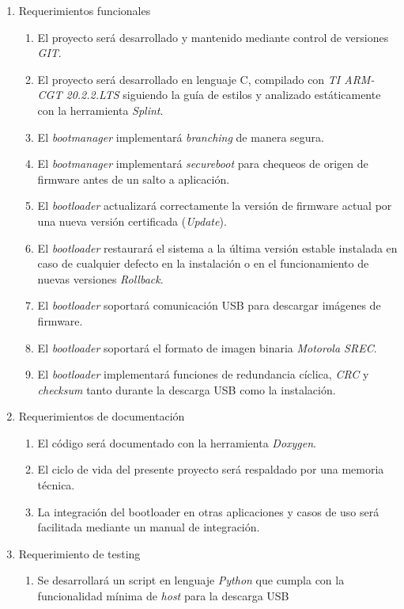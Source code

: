 \documentclass[12pt,a4paper]{article}
\begin{document}
\begin{enumerate}
	\item Requerimientos funcionales
		\begin{enumerate}
			\item El proyecto será desarrollado y mantenido mediante control de versiones \textit{GIT}.
			\item El proyecto será desarrollado en lenguaje C, compilado con \textit{TI ARM-CGT 20.2.2.LTS} siguiendo la guía de estilos y analizado 
			estáticamente con la herramienta \textit{Splint}.
			\item El \textit{bootmanager} implementará \textit{branching} de manera segura.
			\item El \textit{bootmanager} implementará \textit{secureboot} para chequeos de origen de firmware antes de un salto a aplicación. 
			\item El \textit{bootloader} actualizará correctamente la versión de firmware actual por una nueva versión certificada 	
			(\textit{Update}).
			\item El \textit{bootloader} restaurará el sistema a la última versión estable instalada en caso de cualquier defecto en la 
			instalación o en el funcionamiento de nuevas versiones \textit{Rollback}.
			\item El \textit{bootloader} soportará comunicación USB para descargar imágenes de firmware.
			\item El \textit{bootloader} soportará el formato de imagen binaria \textit{Motorola SREC}.
			\item El \textit{bootloader} implementará funciones de redundancia cíclica, \textit{CRC} y \textit{checksum} tanto durante la descarga 
			USB como la instalación.
		\end{enumerate}
	\item Requerimientos de documentación
		\begin{enumerate}
			\item El código será documentado con la herramienta \textit{Doxygen}.
			\item El ciclo de vida del presente proyecto será respaldado por una memoria técnica.
			\item La integración del bootloader en otras aplicaciones y casos de uso será facilitada mediante un manual de integración.
		\end{enumerate}
	\item Requerimiento de testing
		\begin{enumerate}
			\item Se desarrollará un script en lenguaje \textit{Python} que cumpla con la funcionalidad mínima de \textit{host} para la descarga USB 

\end{enumerate}
\end{enumerate}
\end{document}
